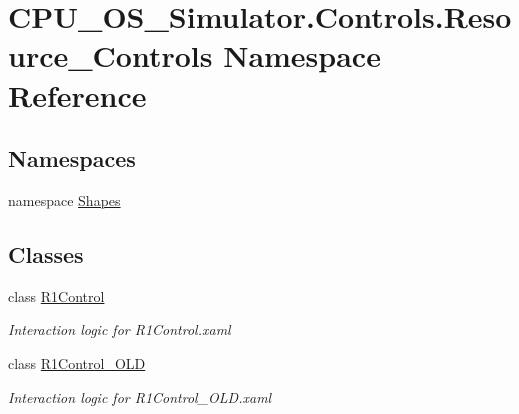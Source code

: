 \hypertarget{namespace_c_p_u___o_s___simulator_1_1_controls_1_1_resource___controls}{}\section{C\+P\+U\+\_\+\+O\+S\+\_\+\+Simulator.\+Controls.\+Resource\+\_\+\+Controls Namespace Reference}
\label{namespace_c_p_u___o_s___simulator_1_1_controls_1_1_resource___controls}
\subsection*{Namespaces}
\begin{DoxyCompactItemize}
\item 
namespace \hyperlink{namespace_c_p_u___o_s___simulator_1_1_controls_1_1_resource___controls_1_1_shapes}{Shapes}
\end{DoxyCompactItemize}
\subsection*{Classes}
\begin{DoxyCompactItemize}
\item 
class \hyperlink{class_c_p_u___o_s___simulator_1_1_controls_1_1_resource___controls_1_1_r1_control}{R1\+Control}
\begin{DoxyCompactList}\small\item\em Interaction logic for R1\+Control.\+xaml \end{DoxyCompactList}\item 
class \hyperlink{class_c_p_u___o_s___simulator_1_1_controls_1_1_resource___controls_1_1_r1_control___o_l_d}{R1\+Control\+\_\+\+O\+L\+D}
\begin{DoxyCompactList}\small\item\em Interaction logic for R1\+Control\+\_\+\+O\+L\+D.\+xaml \end{DoxyCompactList}\end{DoxyCompactItemize}
